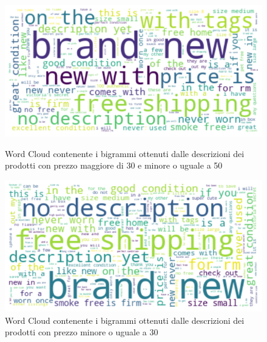 \begin{figure}[!htb]
   \begin{minipage}{0.48\textwidth}
     \centering
     \includegraphics[width=.9\linewidth]{30_50}
	\caption{Word Cloud contenente i bigrammi ottenuti dalle descrizioni dei prodotti con prezzo maggiore di 30 e minore o uguale a 50}
	\label{fig:30_50}   
	\end{minipage}\hfill
   \begin{minipage}{0.48\textwidth}
     \centering
     \includegraphics[width=.9\linewidth]{minore_30}
     \caption{Word Cloud contenente i bigrammi ottenuti dalle descrizioni dei prodotti con prezzo minore o uguale a 30}
     \label{Fig:minore_30}
   \end{minipage}
\end{figure}





